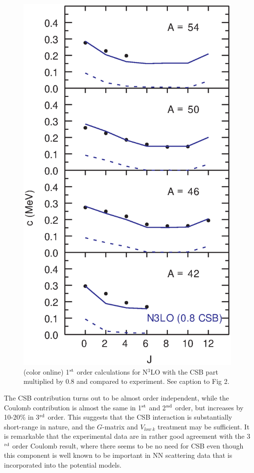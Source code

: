 \documentclass[
10pt,
showpacs,preprintnumbers,footinbib,
amsmath,amssymb,
aps,
prl,twocolumn,groupedaddress,superscriptaddress,
showkeys
]{revtex4-1}
\begin{document}
\begin{figure}
\includegraphics[scale=0.35]{c1e.eps}
\caption{(color online) 1$^{\rm st}$ order calculations for N$^3$LO
with the CSB part multiplied by 0.8 and compared to
experiment. See caption to Fig 2.}
\end{figure}



The CSB contribution turns out to be
almost order independent, while the Coulomb contribution is 
almost the same in 1$^{\rm st}$ and 2$^{\rm nd}$ order,
but increases by 10-20\% in 3$^{\rm rd}$ order. This suggests that the CSB interaction is substantially short-range in nature, and the $G$-matrix and $V_{low~k}$ treatment may be sufficient. It is remarkable that the
experimental data are in rather good agreement with the 3$^{\rm rd}$ order
Coulomb result, where there seems to be no need for CSB
even though this component is
well known to be important in NN scattering data that is
incorporated into the potential models.
\end{document}
